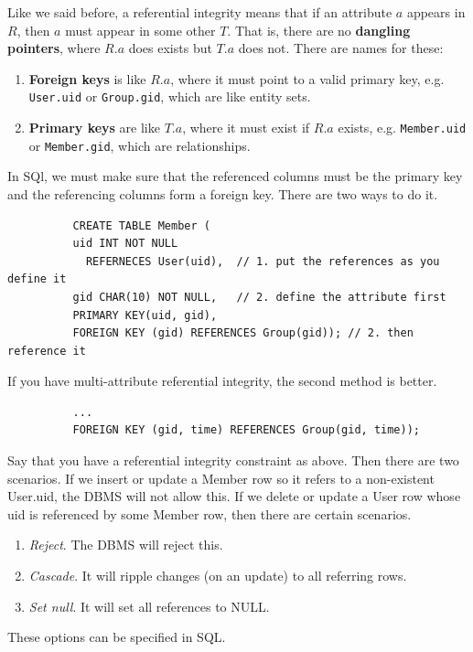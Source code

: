 \documentclass{article}
\begin{document}
      \begin{definition}
        Like we said before, a referential integrity means that if an attribute $a$ appears in $R$, then $a$ must appear in some other $T$. That is, there are no \textbf{dangling pointers}, where $R.a$ does exists but $T.a$ does not. There are names for these: 
        \begin{enumerate}
          \item \textbf{Foreign keys} is like $R.a$, where it must point to a valid primary key, e.g. \texttt{User.uid} or \texttt{Group.gid}, which are like entity sets. 
          \item \textbf{Primary keys} are like $T.a$, where it must exist if $R.a$ exists, e.g. \texttt{Member.uid} or \texttt{Member.gid}, which are relationships. 
        \end{enumerate}
        In SQl, we must make sure that the referenced columns must be the primary key and the referencing columns form a foreign key. There are two ways to do it. 
        \begin{lstlisting}
          CREATE TABLE Member (
          uid INT NOT NULL 
            REFERNECES User(uid),  // 1. put the references as you define it
          gid CHAR(10) NOT NULL,   // 2. define the attribute first
          PRIMARY KEY(uid, gid), 
          FOREIGN KEY (gid) REFERENCES Group(gid)); // 2. then reference it
        \end{lstlisting}
        If you have multi-attribute referential integrity, the second method is better. 
        \begin{lstlisting}
          ...
          FOREIGN KEY (gid, time) REFERENCES Group(gid, time)); 
        \end{lstlisting}
      \end{definition}

      \begin{example}
        Say that you have a referential integrity constraint as above. Then there are two scenarios. If we insert or update a Member row so it refers to a non-existent User.uid, the DBMS will not allow this. If we delete or update a User row whose uid is referenced by some Member row, then there are certain scenarios. 
        \begin{enumerate}
          \item \textit{Reject}. The DBMS will reject this. 
          \item \textit{Cascade}. It will ripple changes (on an update) to all referring rows. 
          \item \textit{Set null}. It will set all references to NULL. 
        \end{enumerate}
        These options can be specified in SQL. 
      \end{example}
\end{document}
